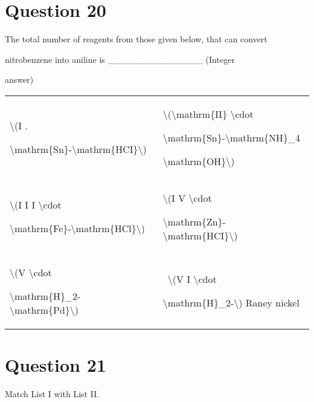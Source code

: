 \documentclass{article}
\begin{document}
\section*{Question 20}
The total number of reagents from those given below, that can convert

nitrobenzene into aniline is \_\_\_\_\_\_\_\_\_\_\_\_\_\_\_ (Integer

answer)



\begin{longtable}[]{@{}ll@{}}

\toprule\noalign{}

\endhead

\bottomrule\noalign{}

\endlastfoot

\textbackslash(I .

\textbackslash mathrm\{Sn\}-\textbackslash mathrm\{HCI\}\textbackslash)~

& \textbackslash(\textbackslash mathrm\{II\} \textbackslash cdot

\textbackslash mathrm\{Sn\}-\textbackslash mathrm\{NH\}\_4

\textbackslash mathrm\{OH\}\textbackslash)~ \\

\textbackslash(I I I \textbackslash cdot

\textbackslash mathrm\{Fe\}-\textbackslash mathrm\{HCl\}\textbackslash)~

& \textbackslash(I V \textbackslash cdot

\textbackslash mathrm\{Zn\}-\textbackslash mathrm\{HCI\}\textbackslash)~ \\

\textbackslash(V \textbackslash cdot

\textbackslash mathrm\{H\}\_2-\textbackslash mathrm\{Pd\}\textbackslash)~

& ~\textbackslash(V I \textbackslash cdot

\textbackslash mathrm\{H\}\_2-\textbackslash) Raney nickel \\

\end{longtable}


\begin{enumerate}[label=(\alph*)]
\end{enumerate}
\newpage
\section*{Question 21}
Match List I with List II.
\end{document}
